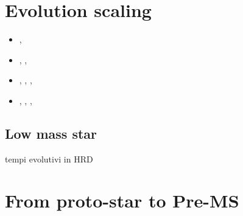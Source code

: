 \documentclass[main.tex]{subfiles}
\begin{document}
\section{Evolution scaling}

\begin{itemize}
    \item {}, \xdiminuisce{\tau}
    \item {}, , 
    \item {}, , , \xaumenta{\tau}
    \item {}, , , \xdiminuisce{\tau}
\end{itemize}

\subsection{Low mass star}

tempi evolutivi in HRD


\section{From proto-star to Pre-MS}
\end{document}
